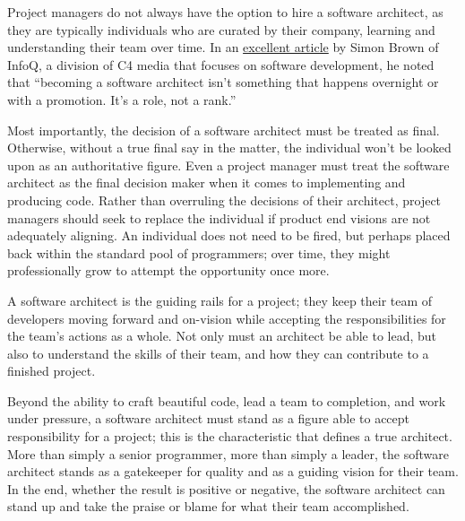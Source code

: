 \documentclass{main}
\begin{document}
Project managers do not always have the option to hire a software architect, as
they are typically individuals who are curated by their company, learning and
understanding their team over time. In an
\href{https://www.infoq.com/articles/architecture-five-things}{excellent article} by Simon Brown of
InfoQ, a division of C4 media that focuses on software development, he noted
that ``becoming a software architect isn't something that happens overnight or
with a promotion. It's a role, not a rank.''

Most importantly, the decision of a software architect must be treated as final.
Otherwise, without a true final say in the matter, the individual won't be
looked upon as an authoritative figure. Even a project manager must treat the
software architect as the final decision maker when it comes to implementing and
producing code. Rather than overruling the decisions of their architect, project
managers should seek to replace the individual if product end visions are not
adequately aligning. An individual does not need to be fired, but perhaps placed
back within the standard pool of programmers; over time, they might
professionally grow to attempt the opportunity once more.

A software architect is the guiding rails for a project; they keep their team of
developers moving forward and on-vision while accepting the responsibilities for
the team's actions as a whole. Not only must an architect be able to lead, but
also to understand the skills of their team, and how they can contribute to a
finished project.

Beyond the ability to craft beautiful code, lead a team to completion, and work
under pressure, a software architect must stand as a figure able to accept
responsibility for a project; this is the characteristic that defines a true
architect. More than simply a senior programmer, more than simply a leader, the
software architect stands as a gatekeeper for quality and as a guiding vision for
their team. In the end, whether the result is positive or negative, the software
architect can stand up and take the praise or blame for what their team
accomplished.
\end{document}
